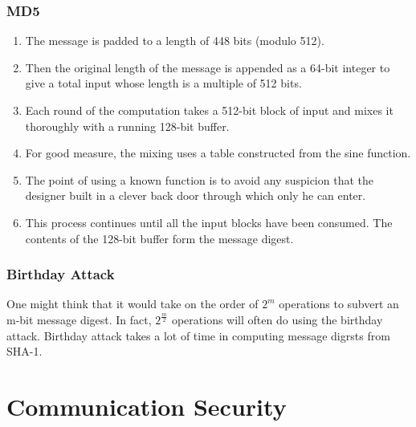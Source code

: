 \documentclass[a4paper,oneside]{book}
\begin{document}
\subsubsection{MD5}
\begin{enumerate}
\item The message is padded to a length of 448 bits (modulo 512).
\item Then the original length of the message is appended as a 64-bit integer to give a total input whose length is a multiple of 512 bits.
\item  Each round of the computation takes a 512-bit block of input and mixes it thoroughly with a running 128-bit buffer. 
\item For good measure, the mixing uses a table constructed from the sine function.
\item The point of using a known function is to avoid any suspicion that the designer built in a clever back door through which only he can enter. 
\item This process continues until all the input blocks have been consumed. The contents of the 128-bit buffer form the message digest.
\end{enumerate}
\subsubsection{Birthday Attack}
One might think that it would take on the order of $2^m$ operations to subvert an m-bit message digest. In fact, $2^{\frac{m}{2}}$ operations will often do using the birthday attack. Birthday attack takes a lot of time in computing message digrsts from SHA-1.
\section{Communication Security}
\end{document}
